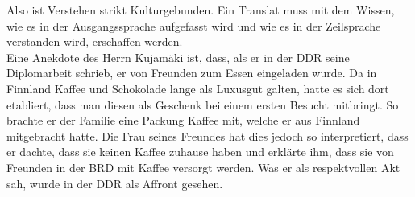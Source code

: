 \documentclass{article}
\begin{document}
	Also ist Verstehen strikt Kulturgebunden. Ein Translat muss mit dem Wissen, wie es in der Ausgangssprache aufgefasst wird und wie es in der Zeilsprache verstanden wird, erschaffen werden. \\
	Eine Anekdote des Herrn Kujamäki ist, dass, als er in der DDR seine Diplomarbeit schrieb, er von Freunden zum Essen eingeladen wurde. Da in Finnland Kaffee und Schokolade lange als Luxusgut galten, hatte es sich dort etabliert, dass man diesen als Geschenk bei einem ersten Besucht mitbringt. So brachte er der Familie eine Packung Kaffee mit, welche er aus Finnland mitgebracht hatte. Die Frau seines Freundes hat dies jedoch so interpretiert, dass er dachte, dass sie keinen Kaffee zuhause haben und erklärte ihm, dass sie von Freunden in der BRD mit Kaffee versorgt werden. Was er als respektvollen Akt sah, wurde in der DDR als Affront gesehen. \\
	
	


	



	   
























	
\end{document}
